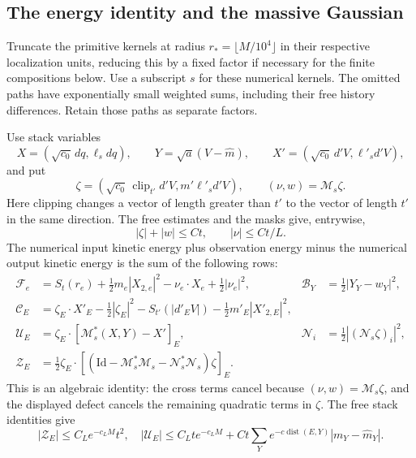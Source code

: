\subsection{The energy identity and the massive Gaussian}
\label{rg:gaussian}

Truncate the primitive kernels at radius
$r_*=\lfloor M/10^4\rfloor$ in their respective localization units,
reducing this by a fixed factor if necessary for the finite compositions
below.  Use a subscript $s$ for these numerical kernels.  The omitted
paths have exponentially small weighted sums, including their free
history differences.  Retain those paths as separate factors.

Use stack variables
\[
 X=(\sqrt{c_0}\,dq,\ell_sdq),\qquad
 Y=\sqrt a(V-\widehat m),\qquad
 X'=(\sqrt{c_0}\,d'V,\ell'_sd'V),
\]
and put
\[
 \zeta=(\sqrt{c_0}\,\operatorname{clip}_{t'}d'V,
                                     m'\ell'_sd'V),
 \qquad(\nu,w)=\mathcal M_s\zeta.
\]
Here clipping changes a vector of length greater than $t'$ to the
vector of length $t'$ in the same direction.  The free estimates and
the masks give, entrywise,
\begin{equation}
 |\zeta|+|w|\le Ct,\qquad |\nu|\le Ct/L.
 \label{rg:stack-sizes}
\end{equation}
The numerical input kinetic energy plus observation energy minus
the numerical output kinetic energy is the sum of the following rows:
\begin{align}
 \mathcal F_e&=S_t(r_e)+\tfrac12m_e|X_{2,e}|^2
                      -\nu_e\cdot X_e+\tfrac12|\nu_e|^2,
 &\mathcal B_Y&=\tfrac12|Y_Y-w_Y|^2,\nonumber\\
 \mathcal C_E&=\zeta_E\cdot X'_E-\tfrac12|\zeta_E|^2
                  -S_{t'}(|d'_EV|)-\tfrac12m'_E|X'_{2,E}|^2,
 \nonumber\\
 \mathcal U_E&=\zeta_E\cdot[\mathcal M_s^*(X,Y)-X']_E,
 &\mathcal N_i&=\tfrac12| (\mathcal N_s\zeta)_i|^2,\nonumber\\
 \mathcal Z_E&=\tfrac12\zeta_E\cdot
     [(\mathrm{Id}-\mathcal M_s^*\mathcal M_s-
                       \mathcal N_s^*\mathcal N_s)\zeta]_E.
 \label{rg:ledger}
\end{align}
This is an algebraic identity: the cross terms cancel because
$(\nu,w)=\mathcal M_s\zeta$, and the displayed defect cancels the
remaining quadratic terms in $\zeta$.  The free stack identities give
\begin{equation}
 |\mathcal Z_E|\le C_Le^{-c_LM}t^2,
 \quad
 |\mathcal U_E|\le C_Lte^{-c_LM}
       +Ct\sum_Y e^{-c\operatorname{dist}(E,Y)}|m_Y-\widehat m_Y|.
 \label{rg:ledger-errors}
\end{equation}

